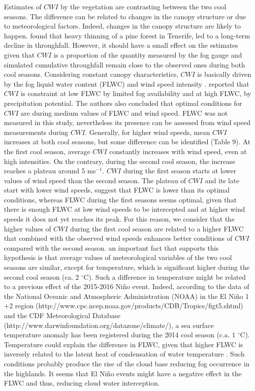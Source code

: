 \documentclass[a4paper,12pt]{article}
\begin{document}
Estimates of $CWI$ by the vegetation are contrasting between the two cool seasons. The difference can be related to changes in the canopy structure or due to meteorological factors. Indeed, changes in the canopy structure are likely to happen. \cite{Aboaletal2000} found that heavy thinning of a pine forest in Tenerife, led to a long-term decline in throughfall. However, it should have a small effect on the estimates given that $CWI$ is a proportion of the quantity measured by the fog gauge and simulated cumulative throughfall remain close to the observed ones during both cool seasons. Considering constant canopy characteristics, $CWI$ is basically driven by the fog liquid water content (FLWC) and wind speed intensity \citep{Villegasetal2008}. \cite{Villegasetal2008} reported that $CWI$ is constraint at low FLWC by limited fog availability and at high FLWC, by precipitation potential. The authors also concluded that optimal conditions for $CWI$ are during medium values of FLWC and wind speed. FLWC was not measured in this study, nevertheless its presence can be assessed from wind speed measurements during $CWI$. Generally, for higher wind speeds, mean $CWI$ increases at both cool seasons, but some difference can be identified (Table 9). At the first cool season, average $CWI$ constantly increases with wind speed, even at high intensities. On the contrary, during the second cool season, the increase reaches a plateau around 5 ms$^{-1}$. $CWI$ during the first season starts at lower values of wind speed than the second season. The plateau of $CWI$ and its late start with lower wind speeds, suggest that FLWC is lower than its optimal conditions, whereas FLWC during the first seasons seems optimal, given that there is enough FLWC at low wind speeds to be intercepted and at higher wind speeds it does not yet reaches its peak. For this reason, we consider that the higher values of $CWI$ during the first cool season are related to a higher FLWC that combined with the observed wind speeds enhances better conditions of $CWI$ compared with the second season. an important fact that supports this hypothesis is that average values of meteorological variables of the two cool seasons are similar, except for temperature, which is significant higher during the second cool season (ca. $2$ $\mathrm{^{\circ}C}$). Such a difference in temperature might be related to a previous effect of the 2015-2016 Niño event. Indeed, according to the data of the National Oceanic and Atmospheric Administration (NOAA) in the El Niño 1$+$2 region (http://www.cpc.ncep.noaa.gov/products/CDB/Tropics/figt5.shtml) and the CDF Meteorological Database (http://www.darwinfoundation.org/datazone/climate/), a sea surface temperature anomaly has been registered during the 2014 cool season (c.a. $1$ $\mathrm{^{\circ}C}$). Temperature could explain the difference in FLWC, given that higher FLWC is inversely related to the latent heat of condensation of water temperature \citep{Thompson2007}. Such conditions probably produce the rise of the cloud base reducing fog occurrence in the highlands. It seems that El Niño events might have a negative effect in the FLWC and thus, reducing cloud water interception. 
\end{document}
